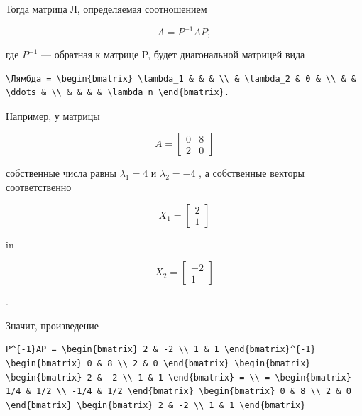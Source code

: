 \documentclass[
  ukrainian,
]{article}
\begin{document}
Тогда матрица Л, определяемая соотношением

\[
\Lambda = P^{-1}AP,
\]

где \(P^{-1}\) --- обратная к матрице P, будет диагональной матрицей
вида

\begin{verbatim}
\Лямбда = \begin{bmatrix} \lambda_1 & & & \\ & \lambda_2 & 0 & \\ & & \ddots & \\ & & & & \lambda_n \end{bmatrix}.
\end{verbatim}

Например, у матрицы

\[
A = \begin{bmatrix} 0 & 8 \\ 2 & 0 \end{bmatrix}
\]

собственные числа равны \(\lambda_1 = 4\) и \(\lambda_2 = -4\) , а
собственные векторы соответственно

\[
X_1 = \begin{bmatrix} 2 \\ 1 \end{bmatrix}
\]

in

\[
X_2 = \begin{bmatrix} -2 \\ 1 \end{bmatrix}
\]

.

Значит, произведение

\begin{verbatim}
P^{-1}AP = \begin{bmatrix} 2 & -2 \\ 1 & 1 \end{bmatrix}^{-1} \begin{bmatrix} 0 & 8 \\ 2 & 0 \end{bmatrix} \begin{bmatrix} \begin{bmatrix} 2 & -2 \\ 1 & 1 \end{bmatrix} = \\ = \begin{bmatrix} 1/4 & 1/2 \\ -1/4 & 1/2 \end{bmatrix} \begin{bmatrix} 0 & 8 \\ 2 & 0 \end{bmatrix} \begin{bmatrix} 2 & -2 \\ 1 & 1 \end{bmatrix}
\end{verbatim}
\end{document}
